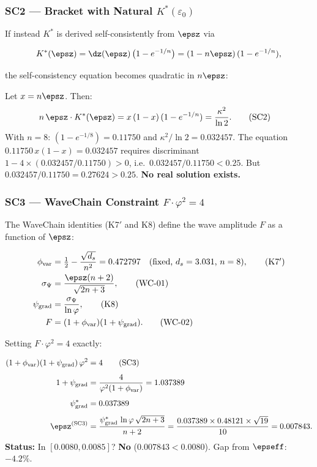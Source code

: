 \documentclass[12pt, a4paper]{article}
\begin{document}
\subsubsection{SC2 — Bracket with Natural $K^*({\varepsilon_0})$}

If instead $K^*$ is derived self-consistently from $\epsz$ via

\[
  K^*(\epsz) = \dz(\epsz)\,\bigl(1 - e^{-1/n}\bigr)
  = (1-n\epsz)\,(1-e^{-1/n}),
\]

the self-consistency equation becomes quadratic in $n\epsz$:

\begin{derivedbox}[title={SC2: Natural $K^*$ Self-Consistency}]
Let $x = n\epsz$. Then:
\begin{align}
  n\,\epsz\cdot K^*(\epsz)
  &= x\,(1-x)\,(1-e^{-1/n})
  = \frac{\kappa^2}{\ln 2}.
  \tag{SC2}
\end{align}
With $n=8$: $(1-e^{-1/8}) = 0.11750$ and $\kappa^2/\ln 2 = 0.032457$.
The equation $0.11750\,x(1-x) = 0.032457$ requires discriminant
$1 - 4\times(0.032457/0.11750) > 0$, i.e.\ $0.032457/0.11750 < 0.25$.
But $0.032457/0.11750 = 0.27624 > 0.25$.
\textbf{No real solution exists.}
\end{derivedbox}

\subsubsection{SC3 — WaveChain Constraint $F\cdot\varphi^2 = 4$}

The WaveChain identities (K7$'$ and K8) define the wave amplitude
$F$ as a function of $\epsz$:

\begin{align}
  \phi_{\rm var} &= \tfrac{1}{2} - \frac{\sqrt{d_s}}{n^2}
  = 0.472797
  \quad\text{(fixed, $d_s=3.031$, $n=8$)},
  \tag{K7$'$}\\
  \sigma_\Psi &= \frac{\epsz(n+2)}{\sqrt{2n+3}},
  \tag{WC-01}\\
  \psi_{\rm grad} &= \frac{\sigma_\Psi}{\ln\varphi},
  \tag{K8}\\
  F &= (1+\phi_{\rm var})(1+\psi_{\rm grad}).
  \tag{WC-02}
\end{align}

Setting $F\cdot\varphi^2 = 4$ exactly:

\begin{derivedbox}[title={SC3: WaveChain Fixed Point $F\cdot\varphi^2=4$}]
\begin{align}
  (1+\phi_{\rm var})(1+\psi_{\rm grad})\,\varphi^2 &= 4
  \tag{SC3}\\[4pt]
  1 + \psi_{\rm grad} &= \frac{4}{\varphi^2(1+\phi_{\rm var})}
  = 1.037389\\[4pt]
  \psi_{\rm grad}^* &= 0.037389\\[4pt]
  \epsz^{(\mathrm{SC3})}
  &= \frac{\psi_{\rm grad}^*\,\ln\varphi\,\sqrt{2n+3}}{n+2}
  = \frac{0.037389\times 0.48121\times\sqrt{19}}{10}
  = 0.007843.
\end{align}
\textbf{Status:} In $[0.0080, 0.0085]$? \textbf{No} ($0.007843 < 0.0080$).
Gap from $\epseff$: $-4.2\%$.
\end{derivedbox}
\end{document}

